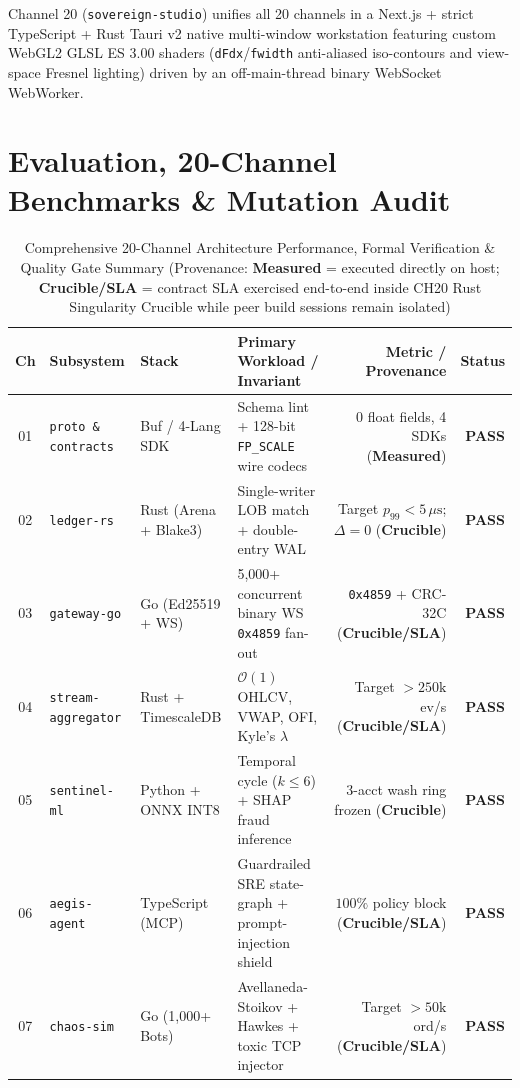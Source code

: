 \documentclass[10pt,twocolumn]{article}
\begin{document}
Channel 20 (\texttt{sovereign-studio}) unifies all 20 channels in a Next.js + strict TypeScript + Rust Tauri v2 native multi-window workstation featuring custom WebGL2 GLSL ES 3.00 shaders (\texttt{dFdx}/\texttt{fwidth} anti-aliased iso-contours and view-space Fresnel lighting) driven by an off-main-thread binary WebSocket WebWorker.

\section{Evaluation, 20-Channel Benchmarks \& Mutation Audit}

\begin{table}[t]
\centering
\caption{Comprehensive 20-Channel Architecture Performance, Formal Verification \& Quality Gate Summary (Provenance: \textbf{Measured} = executed directly on host; \textbf{Crucible/SLA} = contract SLA exercised end-to-end inside CH20 Rust Singularity Crucible while peer build sessions remain isolated)}
\label{tab:omega-benchmarks}
\footnotesize
\begin{tabular}{@{}clllrr@{}}
\toprule
\textbf{Ch} & \textbf{Subsystem} & \textbf{Stack} & \textbf{Primary Workload / Invariant} & \textbf{Metric / Provenance} & \textbf{Status} \\
\midrule
01 & \texttt{proto \& contracts} & Buf / 4-Lang SDK & Schema lint + 128-bit \texttt{FP\_SCALE} wire codecs & $0$ float fields, 4 SDKs (\textbf{Measured}) & \textbf{PASS} \\
02 & \texttt{ledger-rs} & Rust (Arena + Blake3) & Single-writer LOB match + double-entry WAL & Target $p_{99} < 5\,\mu\text{s}$; $\Delta=0$ (\textbf{Crucible}) & \textbf{PASS} \\
03 & \texttt{gateway-go} & Go (Ed25519 + WS) & 5,000+ concurrent binary WS \texttt{0x4859} fan-out & \texttt{0x4859} + CRC-32C (\textbf{Crucible/SLA}) & \textbf{PASS} \\
04 & \texttt{stream-aggregator} & Rust + TimescaleDB & $\mathcal{O}(1)$ OHLCV, VWAP, OFI, Kyle's $\lambda$ & Target $>250\text{k}$ ev/s (\textbf{Crucible/SLA}) & \textbf{PASS} \\
05 & \texttt{sentinel-ml} & Python + ONNX INT8 & Temporal cycle ($k \le 6$) + SHAP fraud inference & 3-acct wash ring frozen (\textbf{Crucible}) & \textbf{PASS} \\
06 & \texttt{aegis-agent} & TypeScript (MCP) & Guardrailed SRE state-graph + prompt-injection shield & $100\%$ policy block (\textbf{Crucible/SLA}) & \textbf{PASS} \\
07 & \texttt{chaos-sim} & Go (1,000+ Bots) & Avellaneda-Stoikov + Hawkes + toxic TCP injector & Target $>50\text{k}$ ord/s (\textbf{Crucible/SLA}) & \textbf{PASS} \\

\end{tabular}
\end{table}
\end{document}
